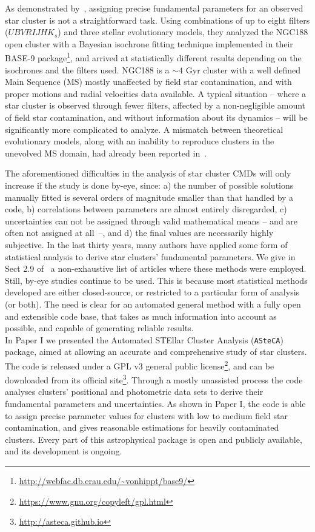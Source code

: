 \documentclass{aa}
\begin{document}
As demonstrated by~\cite{Hills_2015}, assigning precise fundamental
parameters for an observed star cluster is not a straightforward task.
Using combinations of up to eight filters ($UBVRIJHK_s$) and three stellar
evolutionary models, they analyzed the NGC188 open cluster with a
Bayesian isochrone fitting technique implemented in their 
BASE-9 package\footnote{\url{http://webfac.db.erau.edu/~vonhippt/base9/}}, and
arrived at statistically different results depending on the isochrones and the
filters used.
%
NGC188 is a ${\sim}4$ Gyr cluster with a well defined Main Sequence (MS) mostly
unaffected by field star contamination, and with proper motions and radial
velocities data available.
A typical situation -- where a star cluster is observed through fewer
filters, affected by a non-negligible amount of field star contamination, and
without information about its dynamics -- will be significantly more
complicated to analyze.
%
A mismatch between theoretical evolutionary models, along with an
inability to reproduce clusters in the unevolved MS domain, had already
been reported in~\cite{Grocholski_2003}.

The aforementioned difficulties in the analysis of star cluster CMDs will only
increase if the study is done by-eye, since: a) the number of possible solutions
manually fitted is several orders of magnitude smaller than that handled by a
code, b) correlations between parameters are almost entirely disregarded, c)
uncertainties can not be assigned through valid mathematical
means -- and are often not assigned at \mbox{all --}, and d) the final values
are necessarily highly subjective.
%
In the last thirty years, many authors have applied some form of
statistical analysis to derive star clusters' fundamental parameters.
We give in Sect 2.9 of~\citet[][hereafter Paper I]{Perren_2015} a non-exhaustive
list of articles where these methods were employed.
%
Still, by-eye studies continue to be used. This is because most statistical
methods developed are either closed-source, or restricted to a particular form
of analysis (or both).
%
The need is clear for an automated general method with a fully open
and extensible code base, that takes as much information into account as
possible, and capable of generating reliable results.\\

In Paper I we presented the Automated STEllar Cluster Analysis
(\texttt{ASteCA}) package, aimed at allowing an accurate and comprehensive study
of star clusters.
The code is released under a GPL v3 general public
license\footnote{\url{https://www.gnu.org/copyleft/gpl.html}}, and
can be downloaded from its official
site\footnote{\url{http://asteca.github.io}}.
%
Through a mostly unassisted process the code analyses clusters' positional
and photometric data sets to derive their fundamental parameters and
uncertainties.
As shown in Paper I, the code is able to assign precise parameter values for
clusters with low to medium field star contamination, and gives reasonable
estimations for heavily contaminated clusters. Every part of this astrophysical
package is open and publicly available, and its development is ongoing.
\end{document}
